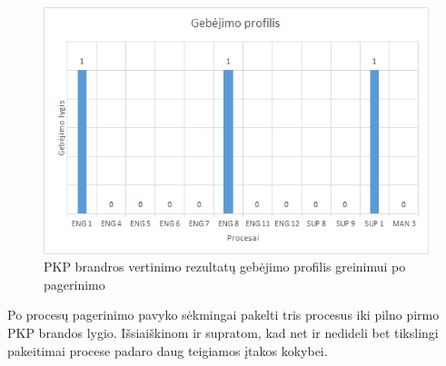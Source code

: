 \documentclass{VUMIFPSkursinis}
\begin{document}
	\begin{figure}[!htbp]
		\includegraphics[scale=1]{img/DiagramaProfilisPo}
		\caption{PKP brandros vertinimo rezultatų gebėjimo profilis greinimui po pagerinimo} %
		\label{img:DiagramaProfilisPo}
	\end{figure}

	Po procesų pagerinimo pavyko sėkmingai pakelti tris procesus iki pilno pirmo PKP brandos lygio. 
	Išsiaiškinom ir supratom, kad net ir nedideli bet tikslingi pakeitimai procese padaro daug teigiamos įtakos kokybei. 
\end{document}

